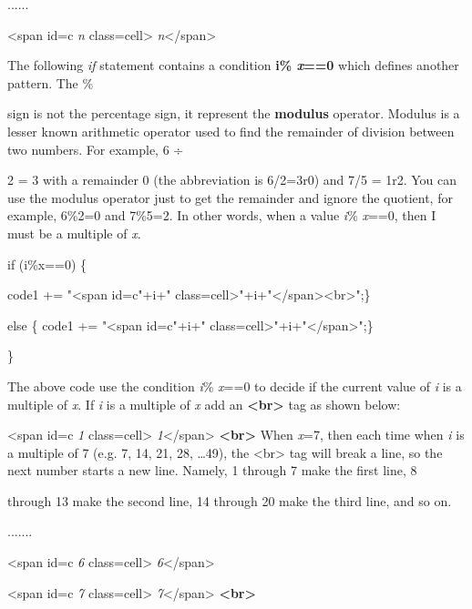 \documentclass[
]{article}
\begin{document}
......

\textless span id=c \emph{n}
class=\textquotesingle cell\textquotesingle\textgreater{}
\emph{n}\textless/span\textgreater{}

The following \emph{if} statement contains a condition \textbf{i\%
\emph{x}==0} which defines another pattern. The \%

sign is not the percentage sign, it represent the \textbf{modulus}
operator. Modulus is a lesser known arithmetic operator used to find the
remainder of division between two numbers. For example, 6 ÷

2 = 3 with a remainder 0 (the abbreviation is 6/2=3r0) and 7/5 = 1r2.
You can use the modulus operator just to get the remainder and ignore
the quotient, for example, 6\%2=0 and 7\%5=2. In other words, when a
value \emph{i}\% \emph{x}==0, then I must be a multiple of \emph{x}.

if (i\%x==0) \{

code1 += "\textless span id=c"+i+"
class=\textquotesingle cell\textquotesingle\textgreater"+i+"\textless/span\textgreater\textless br\textgreater";\}

else \{ code1 += "\textless span id=c"+i+"
class=\textquotesingle cell\textquotesingle\textgreater"+i+"\textless/span\textgreater";\}

\}

The above code use the condition \emph{i}\% \emph{x}==0 to decide if the
current value of \emph{i} is a multiple of \emph{x}. If \emph{i} is a
multiple of \emph{x} add an \textbf{\textless br\textgreater{}} tag as
shown below:

\textless span id=c \emph{1}
class=\textquotesingle cell\textquotesingle\textgreater{}
\emph{1}\textless/span\textgreater{} \textbf{\textless br\textgreater{}}
When \emph{x}=7, then each time when \emph{i} is a multiple of 7 (e.g.
7, 14, 21, 28, \ldots49), the \textless br\textgreater{} tag will break
a line, so the next number starts a new line. Namely, 1 through 7 make
the first line, 8

through 13 make the second line, 14 through 20 make the third line, and
so on.

.......

\textless span id=c \emph{6}
class=\textquotesingle cell\textquotesingle\textgreater{}
\emph{6}\textless/span\textgreater{}

\textless span id=c \emph{7}
class=\textquotesingle cell\textquotesingle\textgreater{}
\emph{7}\textless/span\textgreater{} \textbf{\textless br\textgreater{}}
\end{document}
